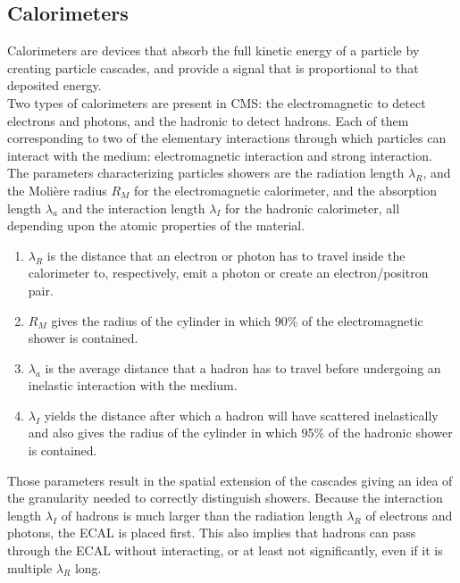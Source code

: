 		\subsection{Calorimeters}
		\label{sec:lhc_and_cms__calorimeters}

			Calorimeters are devices that absorb the full kinetic energy of a particle by creating particle cascades, and provide a signal that is proportional to that deposited energy. \\

			Two types of calorimeters are present in CMS: the electromagnetic to detect electrons and photons, and the hadronic to detect hadrons. Each of them corresponding to two of the elementary interactions through which particles can interact with the medium: electromagnetic interaction and strong interaction. \\

			The parameters characterizing particles showers are the radiation length $ \lambda_R $, and the Molière radius $ R_M $ for the electromagnetic calorimeter, and the absorption length $ \lambda_a $ and the interaction length $ \lambda_I $ for the hadronic calorimeter, all depending upon the atomic properties of the material.
			\begin{enumerate}
				\item[] $ \lambda_R $ is the distance that an electron or photon has to travel inside the calorimeter to, respectively, emit a photon or create an electron/positron pair.
				\item[] $ R_M $ gives the radius of the cylinder in which 90\% of the electromagnetic shower is contained.
				\item[] $ \lambda_a $ is the average distance that a hadron has to travel before undergoing an inelastic interaction with the medium.
				\item[] $ \lambda_I $ yields the distance after which a hadron will have scattered inelastically and also gives the radius of the cylinder in which 95\% of the hadronic shower is contained.
			\end{enumerate}
			Those parameters result in the spatial extension of the cascades giving an idea of the granularity needed to correctly distinguish showers. Because the interaction length $ \lambda_I $ of hadrons is much larger than the radiation length $ \lambda_R $ of electrons and photons, the ECAL is placed first. This also implies that hadrons can pass through the ECAL without interacting, or at least not significantly, even if it is multiple $ \lambda_R $ long. \\

